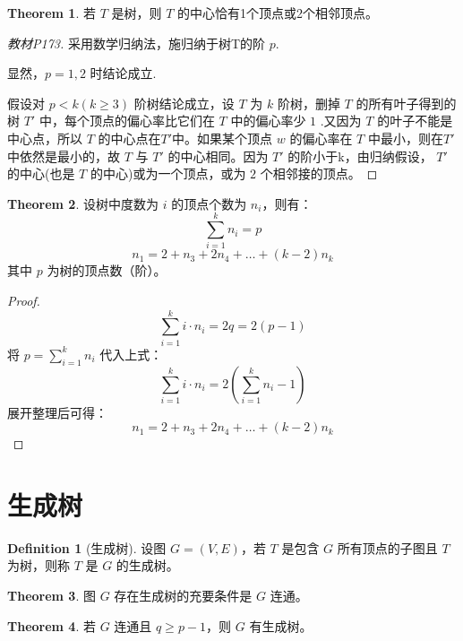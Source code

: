 \documentclass[oneside]{book}
\theoremstyle{definition}
\newtheorem{definition}{Definition}[section]
\newtheorem{theorem}{Theorem}[section]
\begin{document}
\begin{theorem}
	若 \( T \) 是树，则 \( T \) 的中心恰有1个顶点或2个相邻顶点。
\end{theorem}

\begin{proof}[教材P173]
	采用数学归纳法，施归纳于树T的阶 \(p\).
	
	显然，\(p=1,2\) 时结论成立.
	
	假设对 \(p<k (k \geq 3)\) 阶树结论成立，设 \(T\) 为 \(k\) 阶树，删掉 \(T\) 的所有叶子得到的树 $T'$ 中，每个顶点的偏心率比它们在 \(T\) 中的偏心率少 \(1\) .又因为 \(T\) 的叶子不能是中心点，所以 \(T\) 的中心点在$T'$中。如果某个顶点 \(w\) 的偏心率在 \(T\) 中最小，则在$T'$中依然是最小的，故 \(T\) 与 $T'$ 的中心相同。因为 $T'$ 的阶小于k，由归纳假设， $T'$ 的中心(也是 \(T\) 的中心)或为一个顶点，或为 \(2\) 个相邻接的顶点。
	\end{proof}
\begin{theorem}
	设树中度数为 \( i \) 的顶点个数为 \( n_i \)，则有：
	\[
	\sum_{i=1}^k n_i = p
	\]
	\[
	n_1 = 2 + n_3 + 2n_4 + \dots + (k-2)n_k
	\]
	其中 \( p \) 为树的顶点数（阶）。
\end{theorem}

\begin{proof}
	\[
	\sum_{i=1}^k i \cdot n_i = 2q = 2(p - 1)
	\]
	将 \( p = \sum_{i=1}^k n_i \) 代入上式：
	\[
	\sum_{i=1}^k i \cdot n_i = 2\left(\sum_{i=1}^k n_i - 1\right)
	\]
	展开整理后可得：
	\[
	n_1 = 2 + n_3 + 2n_4 + \dots + (k-2)n_k
	\]
\end{proof}

\section{生成树}

\begin{definition}[生成树]
	设图 \( G = (V, E) \)，若 \( T \) 是包含 \( G \) 所有顶点的子图且 \( T \) 为树，则称 \( T \) 是 \( G \) 的生成树。
\end{definition}

\begin{theorem}
	图 \( G \) 存在生成树的充要条件是 \( G \) 连通。
\end{theorem}

\begin{theorem}
	若 \( G \) 连通且 \(q\geq p-1 \)，则 \( G \) 有生成树。
\end{theorem}
\end{document}
